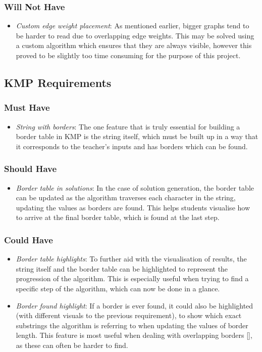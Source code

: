 \documentclass{l4proj}
\begin{document}
\subsubsection{Will Not Have}
\begin{itemize}
	\item
	\emph{Custom edge weight placement}: As mentioned earlier, bigger graphs tend to be harder to read due to overlapping edge weights. This may be solved using a custom algorithm which ensures that they are always visible, however this proved to be slightly too time consuming for the purpose of this project.
\end{itemize}
\subsection{KMP Requirements}
\subsubsection{Must Have}
\begin{itemize}
	\item
	\emph{String with borders}: The one feature that is truly essential for building a border table in KMP is the string itself, which must be built up in a way that it corresponds to the teacher's inputs and has borders which can be found. 
\end{itemize}
\subsubsection{Should Have}
\begin{itemize}
	\item
	\emph{Border table in solutions}: In the case of solution generation, the border table can be updated as the algorithm traverses each character in the string, updating the values as borders are found. This helps students visualise how to arrive at the final border table, which is found at the last step.
\end{itemize}
\subsubsection{Could Have}
\begin{itemize}
	\item
	\emph{Border table highlights}: To further aid with the visualisation of results, the string itself and the border table can be highlighted to represent the progression of the algorithm. This is especially useful when trying to find a specific step of the algorithm, which can now be done in a glance.
	\item
	\emph{Border found highlight}: If a border is ever found, it could also be highlighted (with different visuals to the previous requirement), to show which exact substrings the algorithm is referring to when updating the values of border length. This feature is most useful when dealing with overlapping borders \autoref{}, as these can often be harder to find.
 \end{itemize}
\end{document}
